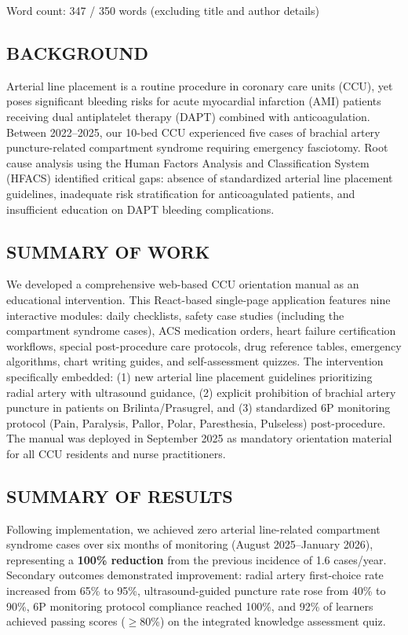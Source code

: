 \documentclass[11pt,a4paper]{article}
\begin{document}
{\small\color{textgray}Word count: 347 / 350 words (excluding title and author details)}

\vspace{1em}

\subsection*{BACKGROUND}
Arterial line placement is a routine procedure in coronary care units (CCU), yet poses significant bleeding risks for acute myocardial infarction (AMI) patients receiving dual antiplatelet therapy (DAPT) combined with anticoagulation. Between 2022--2025, our 10-bed CCU experienced five cases of brachial artery puncture-related compartment syndrome requiring emergency fasciotomy. Root cause analysis using the Human Factors Analysis and Classification System (HFACS) identified critical gaps: absence of standardized arterial line placement guidelines, inadequate risk stratification for anticoagulated patients, and insufficient education on DAPT bleeding complications.

\subsection*{SUMMARY OF WORK}
We developed a comprehensive web-based CCU orientation manual as an educational intervention. This React-based single-page application features nine interactive modules: daily checklists, safety case studies (including the compartment syndrome cases), ACS medication orders, heart failure certification workflows, special post-procedure care protocols, drug reference tables, emergency algorithms, chart writing guides, and self-assessment quizzes. The intervention specifically embedded: (1) new arterial line placement guidelines prioritizing radial artery with ultrasound guidance, (2) explicit prohibition of brachial artery puncture in patients on Brilinta/Prasugrel, and (3) standardized 6P monitoring protocol (Pain, Paralysis, Pallor, Polar, Paresthesia, Pulseless) post-procedure. The manual was deployed in September 2025 as mandatory orientation material for all CCU residents and nurse practitioners.

\subsection*{SUMMARY OF RESULTS}
Following implementation, we achieved zero arterial line-related compartment syndrome cases over six months of monitoring (August 2025--January 2026), representing a \textbf{\textcolor{success}{100\% reduction}} from the previous incidence of 1.6 cases/year. Secondary outcomes demonstrated improvement: radial artery first-choice rate increased from 65\% to 95\%, ultrasound-guided puncture rate rose from 40\% to 90\%, 6P monitoring protocol compliance reached 100\%, and 92\% of learners achieved passing scores ($\geq$80\%) on the integrated knowledge assessment quiz.
\end{document}
